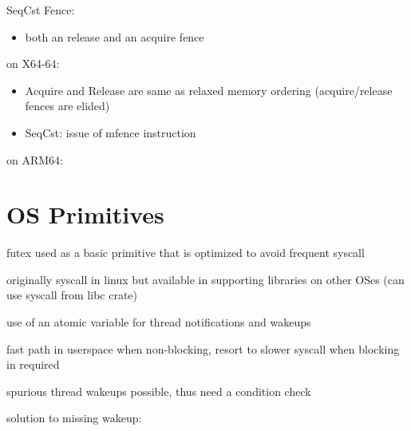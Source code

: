 \documentclass[8pt]{extarticle}
\begin{document}
\begin{multicols*}{2}
    SeqCst Fence:
    \begin{itemize}
      \item both an release and an acquire fence
    \end{itemize}  

    on X64-64:
    \begin{itemize}
    \item Acquire and Release are same as relaxed memory ordering (acquire/release fences are elided)
    \item SeqCst: issue of mfence instruction
    \end{itemize}
  
    on ARM64:

    \vfill\null
    \columnbreak
        
    \section{OS Primitives}

    futex used as a basic primitive that is optimized to avoid frequent syscall

    originally syscall in linux but available in supporting libraries on other OSes (can use syscall from libc crate)

    use of an atomic variable for thread notifications and wakeups

    fast path in userspace when non-blocking, resort to slower syscall when blocking in required

    spurious thread wakeups possible, thus need a condition check

    solution to missing wakeup:


\end{multicols*}
\end{document}
